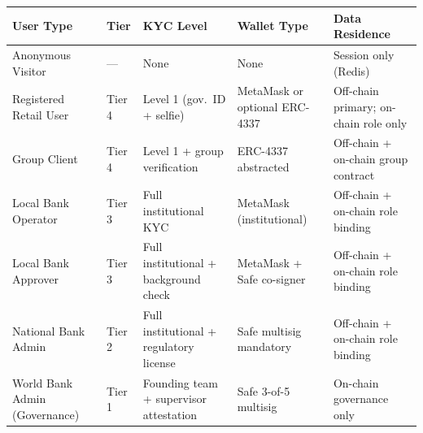 \documentclass[12pt, a4paper]{report}
\newcommand{\tableheadcolor}{\rowcolor{TableHeadBg}}
\begin{document}
\begin{table}[H]
\centering
\begin{tabular}{p{3.1cm}p{1.4cm}p{2.6cm}p{2.4cm}p{3.4cm}}
\toprule
\tableheadcolor
\textbf{User Type} & \textbf{Tier} & \textbf{KYC Level} & \textbf{Wallet Type} & \textbf{Data Residence} \\
\midrule
Anonymous Visitor & --- & None & None & Session only (Redis) \\
Registered Retail User & Tier 4 & Level 1 (gov.\ ID + selfie) & MetaMask or optional ERC-4337 & Off-chain primary; on-chain role only \\
Group Client & Tier 4 & Level 1 + group verification & ERC-4337 abstracted & Off-chain + on-chain group contract \\
Local Bank Operator & Tier 3 & Full institutional KYC & MetaMask (institutional) & Off-chain + on-chain role binding \\
Local Bank Approver & Tier 3 & Full institutional + background check & MetaMask + Safe co-signer & Off-chain + on-chain role binding \\
National Bank Admin & Tier 2 & Full institutional + regulatory license & Safe multisig mandatory & Off-chain + on-chain role binding \\
World Bank Admin (Governance) & Tier 1 & Founding team + supervisor attestation & Safe 3-of-5 multisig & On-chain governance only \\
\bottomrule
\end{tabular}
\end{table}
\end{document}
